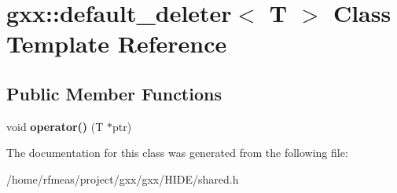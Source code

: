 \hypertarget{classgxx_1_1default__deleter}{}\section{gxx\+:\+:default\+\_\+deleter$<$ T $>$ Class Template Reference}
\label{classgxx_1_1default__deleter}
\subsection*{Public Member Functions}
\begin{DoxyCompactItemize}
\item 
void {\bfseries operator()} (T $\ast$ptr)\hypertarget{classgxx_1_1default__deleter_a0a94c817d8fb40eb33bb123d88022870}{}\label{classgxx_1_1default__deleter_a0a94c817d8fb40eb33bb123d88022870}

\end{DoxyCompactItemize}


The documentation for this class was generated from the following file\+:\begin{DoxyCompactItemize}
\item 
/home/rfmeas/project/gxx/gxx/\+H\+I\+D\+E/shared.\+h\end{DoxyCompactItemize}
